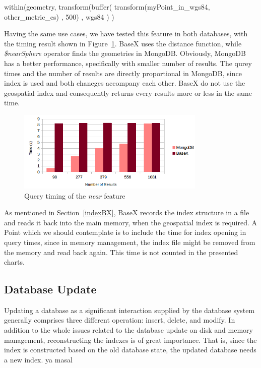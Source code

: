 \documentclass[a4paper,12pt]{article}
\begin{document}
\vspace{10px}
\begin{fakeJSON} 
within(geometry,
       transform(buffer(
                   transform(myPoint_in_wgs84, other_metric_cs)
                   , 500)
                 , wgs84
                )
      )
\end{fakeJSON}
\vspace{10px}
Having the same use cases, we have tested this feature in both databases, with the timing result shown in Figure~\ref{figBXvsMongoNear}. BaseX uses the distance function, while \textit{\$nearSphere} operator finds the geometries in MongoDB. Obviously, MongoDB has a better performance, specifically with smaller number of results. The qurey times and the number of results are directly proportional in MongoDB, since index is used and both chaneges accompany each other. BaseX do not use the geospatial index and consequently returns every results more or less in the same time.



\begin{figure}
\centering
\includegraphics[width=0.8\textwidth]{BXvsMongoNear-newColor.png}
\caption{Query timing of the \textit{near} feature}
\label{figBXvsMongoNear}
\end{figure}


As mentioned in Section~\ref{indexBX}, BaseX records the index structure in a file and reads it back into the main memory, when the geospatial index is required. A Point which we should contemplate is to include the time for index opening in query times, since in memory management, the index file might be removed from the memory and read back again. This time is not counted in the presented charts.


\subsection{Database Update}
\label{update}
Updating a database as a significant interaction supplied by the database system generally comprises three different operation: insert, delete, and modify. In addition to the whole issues related to the database update on disk and memory management, reconstructing the indexes is of great importance. That is, since the index is constructed based on the old database state, the updated database needs a new index. ya masal
\end{document}
